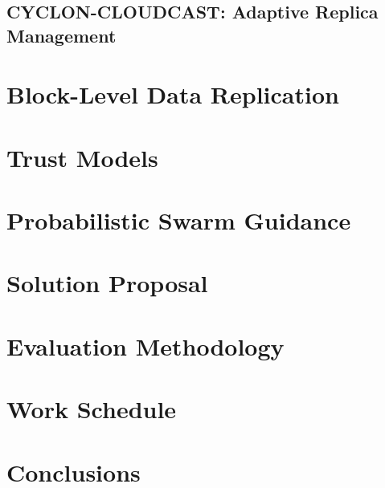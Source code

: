 \documentclass[runningheads]{llncs}
\begin{document}
\subsection{CYCLON-CLOUDCAST: Adaptive Replica Management}
\section{Block-Level Data Replication}
\section{Trust Models}
\section{Probabilistic Swarm Guidance}

\newpage\section{Solution Proposal}\label{sec:proposal}

\section{Evaluation Methodology}\label{sec:methodology}

\section{Work Schedule}\label{sec:workschedule}

\section{Conclusions}\label{sec:conclusion}



\end{document}
